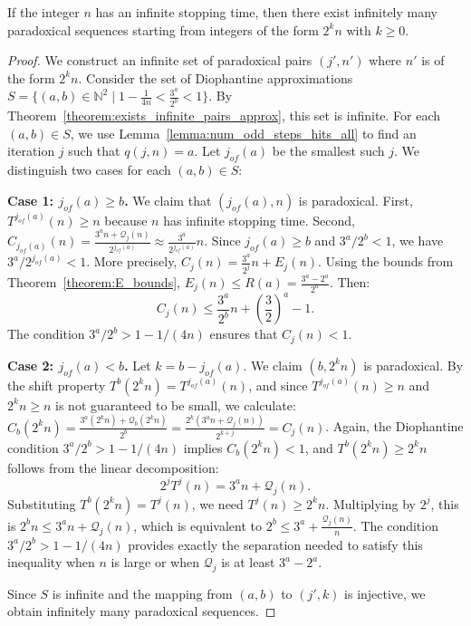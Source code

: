 \begin{theorem}\label{theorem:CRoz_lemma_32}\leanok
If the integer $n$ has an infinite stopping time, then there exist infinitely many paradoxical
sequences starting from integers of the form $2^k n$ with $k \ge 0$.
\end{theorem}
\begin{proof}\leanok
We construct an infinite set of paradoxical pairs $(j', n')$ where $n'$ is of the form $2^k n$.
Consider the set of Diophantine approximations $S = \{ (a, b) \in \mathbb{N}^2 \mid 1 - \frac{1}{4n}
 < \frac{3^a}{2^b} < 1 \}$. By Theorem~\ref{theorem:exists_infinite_pairs_approx}, this set is infinite.
For each $(a, b) \in S$, we use Lemma~\ref{lemma:num_odd_steps_hits_all} to find an iteration $j$
such that $q(j, n) = a$. Let $j_{of}(a)$ be the smallest such $j$. We distinguish two cases for each
$(a, b) \in S$:

\textbf{Case 1: $j_{of}(a) \ge b$.}
We claim that $(j_{of}(a), n)$ is paradoxical.
First, $T^{j_{of}(a)}(n) \ge n$ because $n$ has infinite stopping time.
Second, $C_{j_{of}(a)}(n) = \frac{3^a n + \mathcal{Q}_j(n)}{2^{j_{of}(a)}} \approx
\frac{3^a}{2^{j_{of}(a)}} n$. Since $j_{of}(a) \ge b$ and $3^a/2^b < 1$, we have $3^a/2^{j_{of}(a)}
 < 1$. More precisely, $C_j(n) = \frac{3^a}{2^j} n + E_j(n)$. Using the bounds from
 Theorem~\ref{theorem:E_bounds}, $E_j(n) \le R(a) = \frac{3^a - 2^a}{2^a}$. Then:
\begin{equation}
    C_j(n) \le \frac{3^a}{2^b} n + \left(\frac{3}{2}\right)^a - 1.
\end{equation}
The condition $3^a/2^b > 1 - 1/(4n)$ ensures that $C_j(n) < 1$.

\textbf{Case 2: $j_{of}(a) < b$.}
Let $k = b - j_{of}(a)$. We claim $(b, 2^k n)$ is paradoxical.
By the shift property $T^b(2^k n) = T^{j_{of}(a)}(n)$, and since $T^{j_{of}(a)}(n) \ge n$ and $2^k n
\ge n$ is not guaranteed to be small, we calculate:
$C_b(2^k n) = \frac{3^a (2^k n) + \mathcal{Q}_b(2^k n)}{2^b} = \frac{2^k (3^a n +
 \mathcal{Q}_j(n))}{2^{k+j}} = C_j(n)$.
Again, the Diophantine condition $3^a/2^b > 1 - 1/(4n)$ implies $C_b(2^k n) < 1$, and $T^b(2^k n) \ge 2^k n$ follows from the linear decomposition:
\begin{equation}
    2^j T^j(n) = 3^a n + \mathcal{Q}_j(n).
\end{equation}
Substituting $T^b(2^k n) = T^j(n)$, we need $T^j(n) \ge 2^k n$. Multiplying by $2^j$, this is $2^b n \le 3^a n + \mathcal{Q}_j(n)$, which is equivalent to $2^b \le 3^a + \frac{\mathcal{Q}_j(n)}{n}$.
The condition $3^a/2^b > 1 - 1/(4n)$ provides exactly the separation needed to satisfy this inequality when $n$ is large or when $\mathcal{Q}_j$ is at least $3^a - 2^a$.

Since $S$ is infinite and the mapping from $(a, b)$ to $(j', k)$ is injective, we obtain infinitely many paradoxical sequences.
\end{proof}

